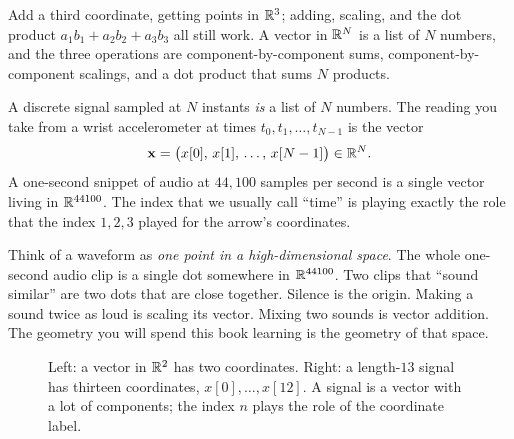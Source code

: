 Add a third coordinate, getting points in
$\mathbb{R}^3$; adding, scaling, and the dot product $a_1b_1+a_2b_2+a_3b_3$ all still
work. A vector in $\mathbb{R}^N$ is a list of $N$ numbers, and the three
operations are component-by-component sums, component-by-component scalings, and a dot product that
sums $N$ products.

A discrete signal sampled at
$N$ instants \emph{is} a list of $N$ numbers. The reading you take from a wrist accelerometer at
times $t_0, t_1, \dots, t_{N-1}$ is the vector
\[
  \mathbf{x} = \big(x[0],\, x[1],\, \dots,\, x[N-1]\big) \in \mathbb{R}^N .
\]
A one-second snippet of audio at $44{,}100$ samples per second is a single vector living in
$\mathbb{R}^{44100}$. The index that we usually call ``time'' is playing exactly the role that the index
$1,2,3$ played for the arrow's coordinates.

\begin{intuitionbox}
Think of a waveform as \emph{one point in a high-dimensional space}. The whole one-second audio clip is a single dot somewhere in $\mathbb{R}^{44100}$.
Two clips that ``sound similar'' are two dots that are close together. Silence is the origin. Making
a sound twice as loud is scaling its vector. Mixing two sounds is vector addition. The geometry you
will spend this book learning is the geometry of that space.
\end{intuitionbox}

\begin{figure}[H]
\centering
{}
\caption{Left: a vector in $\mathbb{R}^2$ has two coordinates. Right: a length-$13$ signal has thirteen
coordinates, $x[0],\dots,x[12]$. A signal is a vector with a lot of components; the index $n$
plays the role of the coordinate label.}
\label{ch03:fig-arrow-to-signal}
\end{figure}

